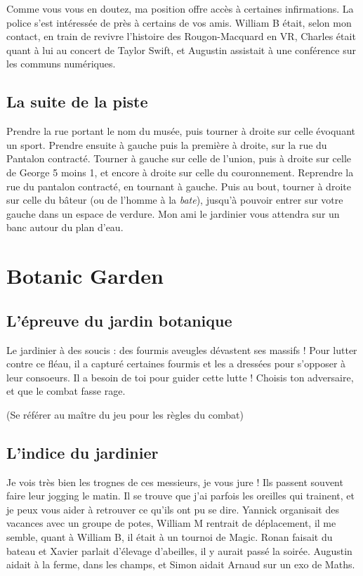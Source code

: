 \documentclass[12pt]{article}
\begin{document}
Comme vous vous en doutez, ma position offre accès à certaines infirmations. La police s'est intéressée de près à certains de vos amis. William B était, selon mon contact, en train de revivre l'histoire des Rougon-Macquard en VR, Charles était quant à lui au concert de Taylor Swift, et Augustin assistait à une conférence sur les communs numériques. 

\pagebreak

\subsection{La suite de la piste}

Prendre la rue portant le nom du musée, puis tourner à droite sur celle évoquant un sport.
Prendre ensuite à gauche puis la première à droite, sur la rue du Pantalon contracté. Tourner à gauche sur celle de l'union, puis à droite sur celle de George 5 moins 1, et encore à droite sur celle du couronnement.
Reprendre la rue du pantalon contracté, en tournant à gauche. Puis au bout, tourner à droite sur celle du bâteur (ou de l'homme à la {\it bate}), jusqu'à pouvoir entrer sur votre gauche dans un espace de verdure. Mon ami le jardinier vous attendra sur un banc autour du plan d'eau.

\section{Botanic Garden}

\subsection{L'épreuve du jardin botanique}

Le jardinier à des soucis : des fourmis aveugles dévastent ses massifs ! 
Pour lutter contre ce fléau, il a capturé certaines fourmis et les a dressées pour s'opposer à leur consoeurs.
Il a besoin de toi pour guider cette lutte ! 
Choisis ton adversaire, et que le combat fasse rage.


(Se référer au maître du jeu pour les règles du combat)

\subsection{L'indice du jardinier}


Je vois très bien les trognes de ces messieurs, je vous jure ! Ils passent souvent faire leur jogging le matin. Il se trouve que j'ai parfois les oreilles qui trainent, et je peux vous aider à retrouver ce qu'ils ont pu se dire. Yannick organisait des vacances avec un groupe de potes, William M rentrait de déplacement, il me semble, quant à William B, il était à un tournoi de Magic. Ronan faisait du bateau et Xavier parlait d'élevage d'abeilles, il y aurait passé la soirée. Augustin aidait à la ferme, dans les champs, et Simon aidait Arnaud sur un exo de Maths. 
\end{document}
